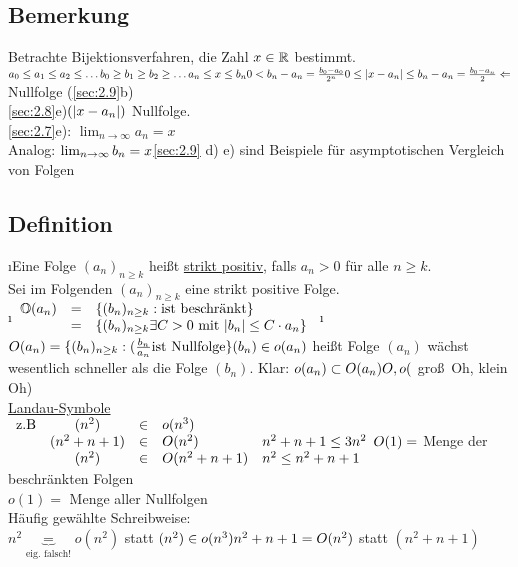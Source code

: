 \subsection{Bemerkung}
Betrachte Bijektionsverfahren, die Zahl $x \in \mathbb{R}$ bestimmt.\\
$a_0 \leq a_1 \leq a_2 \leq \ldots\\
b_0 \geq b_1 \geq b_2 \geq \ldots\\
a_n \leq x \leq b_n\\
0 < b_n - a_n = \frac{b_0 - a_0}{2^n}\\
0 \leq \lvert x-a_n \rvert \leq b_n - a_n = \frac{b_0-a_n}{2} \Leftarrow$ Nullfolge (\ref{sec:2.9}b)\\
\ref{sec:2.8}e)$ (\lvert x-a_n \rvert)$ Nullfolge.\\
\ref{sec:2.7}e): $\lim_{n \rightarrow \infty} a_n = x$\\
Analog: $\lim_{n \rightarrow \infty} b_n = x\\
$\ref{sec:2.9} d) e) sind Beispiele für asymptotischen Vergleich von Folgen
\subsection{Definition}
\begin{enumerate}[a)]
\i Eine Folge $(a_n)_{ n \geq k}$ hei\ss t \underline{strikt positiv}, falls $a_n > 0$ für alle $n \geq k$.\\
Sei im Folgenden $(a_n)_{n \geq k}$ eine strikt positive Folge.\\
\i $\begin{array}{rcl}
\mathbb{O}(a_n) &=& \{ (b_n)_{n \geq k} : \text{ist beschränkt} \}\\
&=& \{ (b_n)_{n \geq k} \exists C > 0 \text{ mit } \lvert b_n \rvert \leq C \cdot a_n \}
\end{array}$
\i $O(a_n) = \{(b_n)_{n \geq k}: (\frac{b_n}{a_n} \text{ist Nullfolge} \}\\
(b_n) \in o(a_n)$ hei\ss t Folge $(a_n)$ wächst wesentlich schneller als die Folge $(b_n)$.
Klar: $o(a_n) \subset O(a_n)\\
O,o ($ \glqq gro\ss \ Oh\grqq, \glqq klein Oh\grqq)\\
\underline{Landau-Symbole}\\
$\begin{array}{lcrll}
\text{z.B}& (n^2) &\in& o(n^3)\\
& (n^2+n+1) &\in& O(n^2) & n^2 + n + 1 \leq 3n^2\\
& (n^2) &\in&O(n^2 + n +1) &n^2 \leq n^2 + n + 1
\end{array}\\
O(1) =$ Menge der beschränkten Folgen\\
$o(1)=$ Menge aller Nullfolgen\\
Häufig gewählte Schreibweise:\\
$n^2 \underbrace{=}_{\text{eig. falsch!}} o(n^2)$ statt $(n^2) \in o(n^3)\\
n^2+n+1 =O(n^2)$ statt $(n^2+n+1)$
\end{enumerate}
